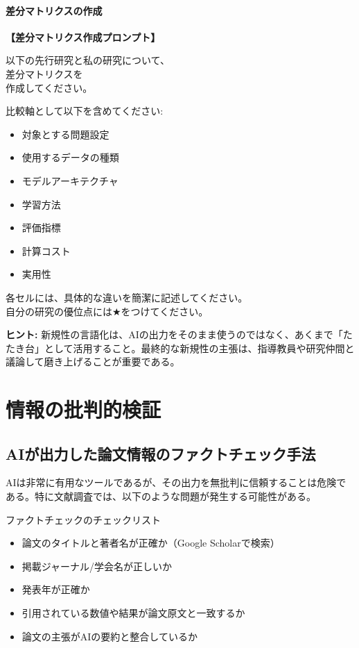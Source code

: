 \paragraph{差分マトリクスの作成}\mbox{}

\begin{promptbox}
\textbf{【差分マトリクス作成プロンプト】}

以下の先行研究と私の研究について、\\
差分マトリクスを\\
作成してください。

比較軸として以下を含めてください:
\begin{itemize}
\item 対象とする問題設定
\item 使用するデータの種類
\item モデルアーキテクチャ
\item 学習方法
\item 評価指標
\item 計算コスト
\item 実用性
\end{itemize}

各セルには、具体的な違いを簡潔に記述してください。\\
自分の研究の優位点には$\bigstar$をつけてください。
\end{promptbox}

\begin{screen}
\textbf{ヒント:} 新規性の言語化は、AIの出力をそのまま使うのではなく、あくまで「たたき台」として活用すること。最終的な新規性の主張は、指導教員や研究仲間と議論して磨き上げることが重要である。
\end{screen}

\section{情報の批判的検証}
\label{sec:3.4}

\subsection{AIが出力した論文情報のファクトチェック手法}

AIは非常に有用なツールであるが、その出力を無批判に信頼することは危険である。特に文献調査では、以下のような問題が発生する可能性がある。

\begin{itembox}[l]{ファクトチェックのチェックリスト}
\begin{itemize}
\item[$\square$] 論文のタイトルと著者名が正確か（Google Scholarで検索）
\item[$\square$] 掲載ジャーナル/学会名が正しいか
\item[$\square$] 発表年が正確か
\item[$\square$] 引用されている数値や結果が論文原文と一致するか
\item[$\square$] 論文の主張がAIの要約と整合しているか
\end{itemize}
\end{itembox}

